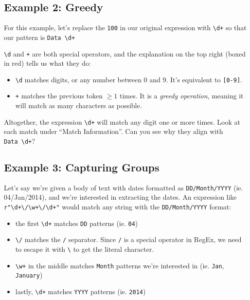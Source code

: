 \documentclass[
  letterpaper,
  DIV=11,
  numbers=noendperiod]{scrreprt}
\providecommand{\tightlist}{%
  \setlength{\itemsep}{0pt}\setlength{\parskip}{0pt}}\usepackage{longtable,booktabs,array}
\begin{document}
\subsection{Example 2: Greedy}\label{example-2-greedy}

For this example, let's replace the \texttt{100} in our original
expression with \texttt{\textbackslash{}d+} so that our pattern is
\texttt{Data\ \textbackslash{}d+}

\texttt{\textbackslash{}d} and \texttt{+} are both special operators,
and the explanation on the top right (boxed in red) tells us what they
do:

\begin{itemize}
\tightlist
\item
  \texttt{\textbackslash{}d} matches digits, or any number between 0 and
  9. It's equivalent to \texttt{{[}0-9{]}}.
\item
  \texttt{+} matches the previous token \(\geq 1\) times. It is a
  \emph{greedy operation}, meaning it will match as many characters as
  possible.
\end{itemize}

Altogether, the expression \texttt{\textbackslash{}d+} will match any
digit one or more times. Look at each match under ``Match Information''.
Can you see why they align with \texttt{Data\ \textbackslash{}d+}?

\subsection{Example 3: Capturing
Groups}\label{example-3-capturing-groups}

Let's say we're given a body of text with dates formatted as
\texttt{DD/Month/YYYY} (ie. 04/Jan/2014), and we're interested in
extracting the dates. An expression like
\texttt{r"\textbackslash{}d+\textbackslash{}/\textbackslash{}w+\textbackslash{}/\textbackslash{}d+"}
would match any string with the \texttt{DD/Month/YYYY} format:

\begin{itemize}
\tightlist
\item
  the first \texttt{\textbackslash{}d+} matches \texttt{DD} patterns
  (ie. \texttt{04})
\item
  \texttt{\textbackslash{}/} matches the \texttt{/} separator. Since
  \texttt{/} is a special operator in RegEx, we need to escape it with
  \texttt{\textbackslash{}} to get the literal character.
\item
  \texttt{\textbackslash{}w+} in the middle matches \texttt{Month}
  patterns we're interested in (ie. \texttt{Jan}, \texttt{January})
\item
  lastly, \texttt{\textbackslash{}d+} matches \texttt{YYYY} patterns
  (ie. \texttt{2014})
\end{itemize}
\end{document}
